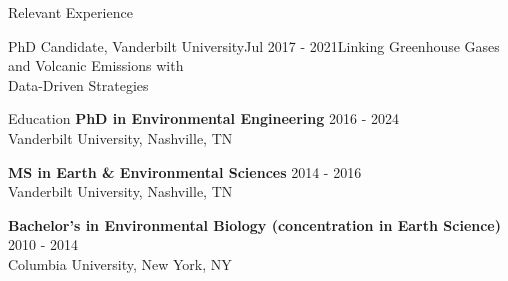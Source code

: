 \documentclass{resume} %
\newcommand{\commentblock}[1]{}
\begin{document}
\begin{rSection}{Relevant Experience}
{\begin{rSubsection}{PhD Candidate, Vanderbilt University}{Jul 2017 - 2021}{Linking Greenhouse Gases and Volcanic Emissions with \\ Data-Driven Strategies}{}
        \end{rSubsection}
    }
    
    \commentblock{
        \begin{rSubsection}{MS Candidate, Vanderbilt University}{Oct 2015 - Aug 2016}{Robust Statistical Analysis of Fugitive Methane Emissions at Hydraulically Fractured Sites}{Oliver Springs, TN}
        \item {Fashioned a mobile laboratory with state-of-the-art gas analyzer and accompanying equipment}
        \item {Implemented many variants of two-sample hypothesis (A/B) tests to separate the true amounts \\ of normal background gases from fugitive leaks caused by hydraulic fracturing procedures}
        
        \end{rSubsection}
    }

    
    \end{rSection} 


\begin{rSection}{Education}
    \fontsize{9}{10}\selectfont
    {\bf PhD in Environmental Engineering} \hfill {2016 - 2024}
    \\ 
    Vanderbilt University, Nashville, TN 
    
    {\bf MS in Earth \& Environmental Sciences}  \hfill {2014 - 2016}
    \\
    Vanderbilt University, Nashville, TN
     
    {\bf Bachelor's in Environmental Biology (concentration in Earth Science)}  \hfill {2010 - 2014}
    \\
    Columbia University, New York, NY
    
    \end{rSection}

\end{document}
